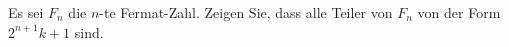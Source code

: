 
\begin{exercise}

Es sei $F_n$ die $n$-te Fermat-Zahl. Zeigen Sie, dass alle Teiler von $F_n$
von der Form $2^{n+1}k + 1$ sind.

\end{exercise}


\begin{solution}

\phantom{}

\end{solution}

